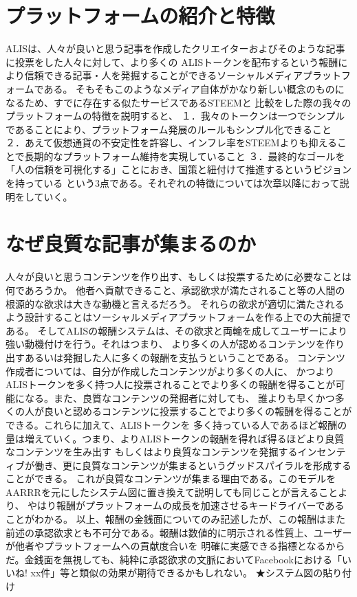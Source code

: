 \documentclass{jsarticle}
\begin{document}
\section{プラットフォームの紹介と特徴}
ALISは、人々が良いと思う記事を作成したクリエイターおよびそのような記事に投票をした人々に対して、より多くの
ALISトークンを配布するという報酬により信頼できる記事・人を発掘することができるソーシャルメディアプラットフォームである。
そもそもこのようなメディア自体がかなり新しい概念のものになるため、すでに存在する似たサービスであるSTEEMと
比較をした際の我々のプラットフォームの特徴を説明すると、
１．我々のトークンは一つでシンプルであることにより、プラットフォーム発展のルールもシンプル化できること
２．あえて仮想通貨の不安定性を許容し、インフレ率をSTEEMよりも抑えることで長期的なプラットフォーム維持を実現していること
３．最終的なゴールを「人の信頼を可視化する」ことにおき、国策と紐付けて推進するというビジョンを持っている
という3点である。それぞれの特徴については次章以降におって説明をしていく。
\section{なぜ良質な記事が集まるのか}
人々が良いと思うコンテンツを作り出す、もしくは投票するために必要なことは何であろうか。  
他者へ貢献できること、承認欲求が満たされること等の人間の根源的な欲求は大きな動機と言えるだろう。
それらの欲求が適切に満たされるよう設計することはソーシャルメディアプラットフォームを作る上での大前提である。
そしてALISの報酬システムは、その欲求と両輪を成してユーザーにより強い動機付けを行う。それはつまり、
より多くの人が認めるコンテンツを作り出すあるいは発掘した人に多くの報酬を支払うということである。
コンテンツ作成者については、自分が作成したコンテンツがより多くの人に、
かつよりALISトークンを多く持つ人に投票されることでより多くの報酬を得ることが可能になる。また、良質なコンテンツの発掘者に対しても、
誰よりも早くかつ多くの人が良いと認めるコンテンツに投票することでより多くの報酬を得ることができる。これらに加えて、ALISトークンを
多く持っている人であるほど報酬の量は増えていく。つまり、よりALISトークンの報酬を得れば得るほどより良質なコンテンツを生み出す
もしくはより良質なコンテンツを発掘するインセンティブが働き、更に良質なコンテンツが集まるというグッドスパイラルを形成することができる。
これが良質なコンテンツが集まる理由である。このモデルをAARRRを元にしたシステム図に置き換えて説明しても同じことが言えることより、
やはり報酬がプラットフォームの成長を加速させるキードライバーであることがわかる。
以上、報酬の金銭面についてのみ記述したが、この報酬はまた前述の承認欲求とも不可分である。報酬は数値的に明示される性質上、ユーザーが他者やプラットフォームへの貢献度合いを
明確に実感できる指標となるからだ。金銭面を無視しても、純粋に承認欲求の文脈においてFacebookにおける「いいね! xx件」等と類似の効果が期待できるかもしれない。
 ★システム図の貼り付け
\end{document}
